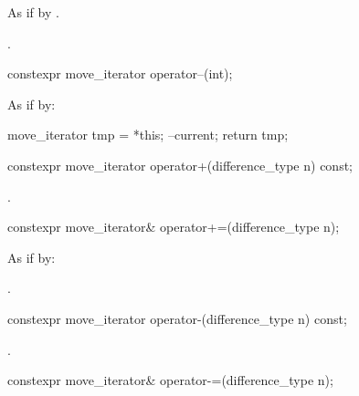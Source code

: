 \documentclass{wg21}
\begin{document}
\begin{itemdescr}
	\pnum
	\effects As if by .
	
	\pnum
	\returns {}.
\end{itemdescr}

%
\begin{itemdecl}
	constexpr move_iterator operator--(int);
\end{itemdecl}

\begin{itemdescr}
	\pnum
	\effects
	As if by:
	\begin{codeblock}
		move_iterator tmp = *this;
		--current;
		return tmp;
	\end{codeblock}
\end{itemdescr}

%
\begin{itemdecl}
	constexpr move_iterator operator+(difference_type n) const;
\end{itemdecl}

\begin{itemdescr}
	\pnum
	\returns {}.
\end{itemdescr}

%
\begin{itemdecl}
	constexpr move_iterator& operator+=(difference_type n);
\end{itemdecl}

\begin{itemdescr}
	\pnum
	\effects As if by: 
	
	\pnum
	\returns {}.
\end{itemdescr}

%
\begin{itemdecl}
	constexpr move_iterator operator-(difference_type n) const;
\end{itemdecl}

\begin{itemdescr}
	\pnum
	\returns {}.
\end{itemdescr}

%
\begin{itemdecl}
	constexpr move_iterator& operator-=(difference_type n);
\end{itemdecl}
\end{document}

